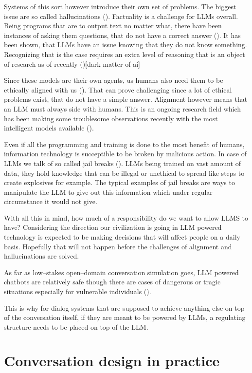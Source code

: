 \documentclass[12pt]{report}
\begin{document}
{Systems of this sort however introduce their own set of problems.
The biggest issue are so called hallucinations ().
Factuality is a challenge for LLMs overall.
Being programs that are to output text no matter what,
there have been instances of asking them questions,
that do not have a correct answer ().
It has been shown, that LLMs have an issue
knowing that they do not know something.
Recognizing that is the case requires
an extra level of reasoning
that is an object of research as of recently ()[dark matter of ai]

Since these models are their own agents,
us humans also need them to be ethically aligned with us ().
That can prove challenging since a lot of ethical problems exist,
that do not have a simple answer.
Alignment however means that an LLM must always side with humans.
This is an ongoing research field which has been making some
troublesome observations recently with the most intelligent models available ().

Even if all the programming and training is done to the most benefit of humans,
information technology is succeptible to be broken by malicious action.
In case of LLMs we talk of so called jail breaks ().
LLMs being trained on vast amount of data,
they hold knowledge that can be illegal or unethical to spread
like steps to create explosives for example.
The typical examples of jail breaks are ways to manipulate
the LLM to give out this information
which under regular circumstance it would not give.

With all this in mind,
how much of a responsibility do we want to allow LLMS to have?
Considering the direction our civilization is going in
LLM powered technology is expected to be making decisions
that will affect people on a daily basis.
Hopefully that will not happen before
the challenges of alignment and hallucinations
are solved.

As far as low–stakes open–domain conversation simulation goes,
LLM powered chatbots are relatively safe
though there are cases of dangerous or tragic situations
especially for vulnerable individuals ().

This is why for dialog systems that are supposed to achieve
anything else on top of the conversation itself,
if they are meant to be powered by LLMs,
a regulating structure needs to be placed on top of the LLM.

\section{Conversation design in practice}

}
\end{document}
